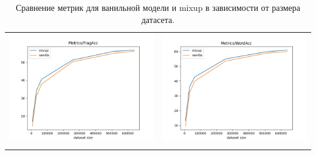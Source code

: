 \begin{longtable}{cc}
\includegraphics[scale=0.4]{./images/mixup_size/all/FragAcc.png} & \includegraphics[scale=0.4]{./images/mixup_size/all/WordAcc.png}\\
\caption{Сравнение метрик для ванильной модели и mixup в зависимости от размера датасета.}
\label{tab:mixup_size_all}
\end{longtable}
